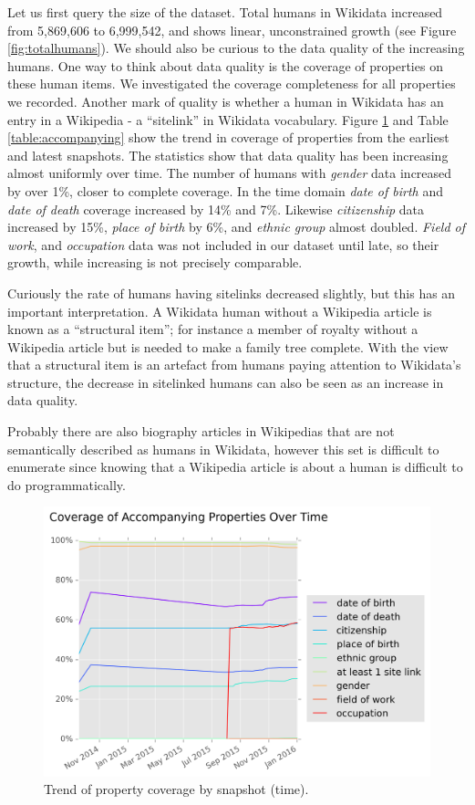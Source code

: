 \documentclass[letterpaper]{article}
\begin{document}
Let us first query the size of the dataset. Total humans in Wikidata increased from 5,869,606 to 6,999,542, and shows linear, unconstrained growth (see Figure \ref{fig:totalhumans}).
We should also be curious to the data quality of the increasing humans. One way to think about data quality is the coverage of properties on these human items. We investigated the coverage completeness for all  properties we recorded. Another mark of quality is whether a human in Wikidata has an entry in a Wikipedia - a ``sitelink'' in Wikidata vocabulary. Figure \ref{fig:accompanying} and Table \ref{table:accompanying} show the trend in coverage of properties from the earliest and latest snapshots. The statistics show that data quality has been increasing almost uniformly over time. The number of humans with \textit{gender} data increased by over 1\%, closer to complete coverage. In the time domain \textit{date of birth} and \textit{date of death} coverage increased by 14\% and 7\%. Likewise \textit{citizenship} data increased by 15\%, \textit{place of birth} by 6\%, and \textit{ethnic group} almost doubled. \textit{Field of work}, and \textit{occupation} data was not included in our dataset until late, so their growth, while increasing is not precisely comparable.

Curiously the rate of humans having sitelinks decreased slightly, but this has an important interpretation. A Wikidata human without a Wikipedia article is known as a ``structural item''; for instance a member of royalty without a Wikipedia article but is needed to make a family tree complete. With the view that a structural item is an artefact from humans paying attention to Wikidata's structure, the decrease in sitelinked humans can also be seen as an increase in data quality. 

Probably there are also biography articles in Wikipedias that are not semantically described as humans in Wikidata, however this set is difficult to enumerate since knowing that a Wikipedia article is about a human is difficult to do programmatically. 


\begin{figure}
\includegraphics[scale=0.5]{figures/additionalprops.png} 
\caption{Trend of property coverage by snapshot (time).}
\label{fig:accompanying}
\end{figure}
\end{document}
